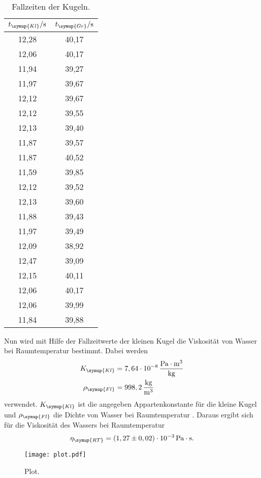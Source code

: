 \begin{table}
  \centering
  \caption{Fallzeiten der Kugeln.}
  \label{tab:Fallzeit}
  \begin{tabular}{c c}
    \toprule
    $t_{\symup{Kl}}/\unit{\second} $ & $t_{\symup{Gr}}/\unit{\second}$ \\
    \midrule
    12,28 & 40,17 \\
    12,06 & 40,17 \\
    11,94 & 39,27 \\
    11,97 & 39,67 \\
    12,12 & 39,67 \\
    12,12 & 39,55 \\
    12,13 & 39,40 \\
    11,87 & 39,57 \\
    11,87 & 40,52 \\
    11,59 & 39,85 \\
    12,12 & 39,52 \\
    12,13 & 39,60 \\
    11,88 & 39,43 \\
    11,97 & 39,49 \\
    12,09 & 38,92 \\
    12,47 & 39,09 \\
    12,15 & 40,11 \\
    12,06 & 40,17 \\
    12,06 & 39,99 \\
    11,84 & 39,88 \\
    \bottomrule
  \end{tabular}
\end{table}

Nun wird mit Hilfe der Fallzeitwerte der kleinen Kugel die Viskosität von Wasser bei Raumtemperatur bestimmt. Dabei werden
\begin{align*}
  K_{\symup{Kl}} &= 7,64\cdot 10^{-8} \,\frac{\unit{\pascal}\cdot\unit{\meter^3}}{\unit{\kilo\gram}} \\
  \rho_{\symup{Fl}} &= 998,2\,\frac{\unit{\kilo\gram}}{\unit{\meter^3}}
\end{align*}
verwendet. $K_{\symup{Kl}}$ ist die angegeben Appartenkonstante für die kleine Kugel \cite{anleitung107}  und $\rho_{\symup{Fl}}$
die Dichte von Wasser bei Raumtemperatur \cite{waterdensity}. Daraus ergibt sich für die Viskosität des Wassers bei Raumtemperatur
\begin{align*}
  \eta_{\symup{RT}} = (1,27 \pm 0,02)\cdot 10^{-3} \,\unit{\pascal}\cdot\unit{\second}.
\end{align*}

\begin{figure}
  \centering
  \texttt{[image: plot.pdf]}
  \caption{Plot.}
  \label{fig:plot}
\end{figure}